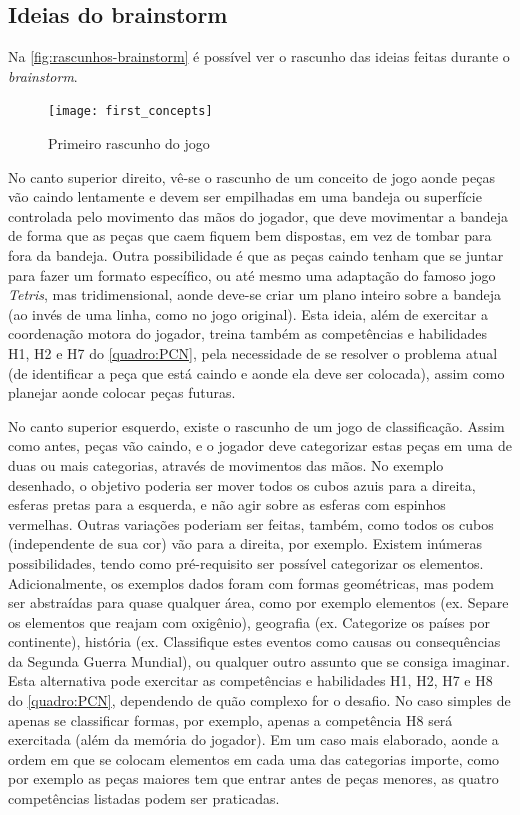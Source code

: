 \subsection{Ideias do brainstorm}\label{subsec-ideias-brainstorm}

Na \autoref{fig:rascunhos-brainstorm} é possível ver o rascunho das ideias feitas durante o \textit{brainstorm}. 

\begin{figure}[h]
	\centering
	\caption{Primeiro rascunho do jogo}
	\texttt{[image: first\_concepts]}
	\legend{\fonteAP}
	\label{fig:rascunhos-brainstorm}
\end{figure}

No canto superior direito, vê-se o rascunho de um conceito de jogo aonde 
peças vão caindo lentamente e devem ser empilhadas em uma bandeja ou 
superfície controlada pelo movimento das mãos do jogador, que deve 
movimentar a bandeja de forma que as peças que caem fiquem bem dispostas, 
em vez de tombar para fora da bandeja. Outra possibilidade é que as 
peças caindo tenham que se juntar para fazer um formato específico, 
ou até mesmo uma adaptação do famoso jogo \textit{Tetris}, mas 
tridimensional, aonde deve-se criar um plano inteiro sobre a bandeja 
(ao invés de uma linha, como no jogo original). Esta ideia, além de
exercitar a coordenação motora do jogador, treina também as 
competências e habilidades H1, H2 e H7 do \autoref{quadro:PCN}, pela
necessidade de se resolver o problema atual (de identificar a 
peça que está caindo e aonde ela deve ser colocada), assim como planejar
aonde colocar peças futuras.

No canto superior esquerdo, existe o rascunho de um jogo de 
classificação. Assim como antes, peças vão caindo, e o jogador 
deve categorizar estas peças em uma de duas ou mais categorias, 
através de movimentos das mãos. No exemplo desenhado, o 
objetivo poderia ser mover todos os cubos azuis para a direita, 
esferas pretas para a esquerda, e não agir sobre as esferas 
com espinhos vermelhas. Outras variações poderiam ser feitas, 
também, como todos os cubos (independente de sua cor) vão 
para a direita, por exemplo. Existem inúmeras possibilidades, 
tendo como pré-requisito ser possível categorizar os elementos. 
Adicionalmente, os exemplos dados foram com formas geométricas, 
mas podem ser abstraídas para quase qualquer área, como por 
exemplo elementos (ex. Separe os elementos que reajam com 
oxigênio), geografia (ex. Categorize os países por continente), 
história (ex. Classifique estes eventos como causas ou 
consequências da Segunda Guerra Mundial), ou qualquer outro 
assunto que se consiga imaginar. Esta alternativa pode 
exercitar as competências e habilidades H1, H2, H7 e H8 do 
\autoref{quadro:PCN}, dependendo de quão complexo for o desafio. 
No caso simples de apenas se classificar formas, por exemplo,
apenas a competência H8 será exercitada (além da memória do jogador). Em um caso mais elaborado, 
aonde a ordem em que se colocam elementos em cada uma das categorias 
importe, como por exemplo as peças maiores tem que entrar antes de 
peças menores, as quatro competências listadas podem ser praticadas.

